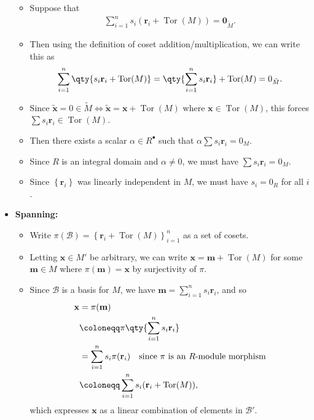 \begin{solution}
\begin{itemize}
  \begin{itemize}
  \item
    Suppose that
    \begin{align*}
    \sum_{i=1}^n s_i (\mathbf{r}_i + \operatorname{Tor}(M)) = \mathbf{0}_{\tilde M}
    .\end{align*}
  \item
    Then using the definition of coset addition/multiplication, we can
    write this as
    \begin{align*}  
    \sum_{i=1}^n \qty { s_i \mathbf{r}_i + \operatorname{Tor}(M)} = 
    \qty{ \sum_{i=1}^n  s_i \mathbf{r}_i} + \operatorname{Tor}(M)  = 0_{\tilde M}
    .\end{align*}
  \item
    Since
    \(\tilde{\mathbf{x}} = 0 \in \tilde M \iff \tilde{\mathbf{x}} = \mathbf{x} + \operatorname{Tor}(M)\)
    where \(\mathbf{x} \in \operatorname{Tor}(M)\), this forces
    \(\sum s_i \mathbf{r}_i \in \operatorname{Tor}(M)\).
  \item
    Then there exists a scalar \(\alpha\in R^{\bullet}\) such that
    \(\alpha \sum s_i \mathbf{r}_i = 0_M\).
  \item
    Since \(R\) is an integral domain and \(\alpha \neq 0\), we must
    have \(\sum s_i \mathbf{r}_i = 0_M\).
  \item
    Since \(\left\{{\mathbf{r}_i}\right\}\) was linearly independent in
    \(M\), we must have \(s_i = 0_R\) for all \(i\).
  \end{itemize}
\item
  \textbf{Spanning:}

  \begin{itemize}
  \item
    Write
    \(\pi(\mathcal B) = \left\{{\mathbf{r}_i + \operatorname{Tor}(M)}\right\}_{i=1}^n\)
    as a set of cosets.
  \item
    Letting \(\mathbf{x} \in M'\) be arbitrary, we can write
    \(\mathbf{x} = \mathbf{m} + \operatorname{Tor}(M)\) for some
    \(\mathbf{m} \in M\) where \(\pi(\mathbf{m}) = \mathbf{x}\) by
    surjectivity of \(\pi\).
  \item
    Since \(\mathcal B\) is a basis for \(M\), we have
    \(\mathbf{m} = \sum_{i=1}^n s_i \mathbf{r}_i\), and so
    \begin{align*}
    \mathbf{x}
    &= \pi(\mathbf{m}) \\
    &\coloneqq\pi\qty{ \sum_{i=1}^n s_i \mathbf{r}_i} \\
    &= \sum_{i=1}^n s_i \pi(\mathbf{r}_i) \quad\text{since $\pi$ is an $R{\hbox{-}}$module morphism}\\
    &\coloneqq\sum_{i=1}^n s_i \mathbf{(}\mathbf{r}_i + \operatorname{Tor}(M))
    ,\end{align*}
    which expresses \(\mathbf{x}\) as a linear combination of elements
    in \(\mathcal B'\).
  \end{itemize}
\end{itemize}


\end{solution}
